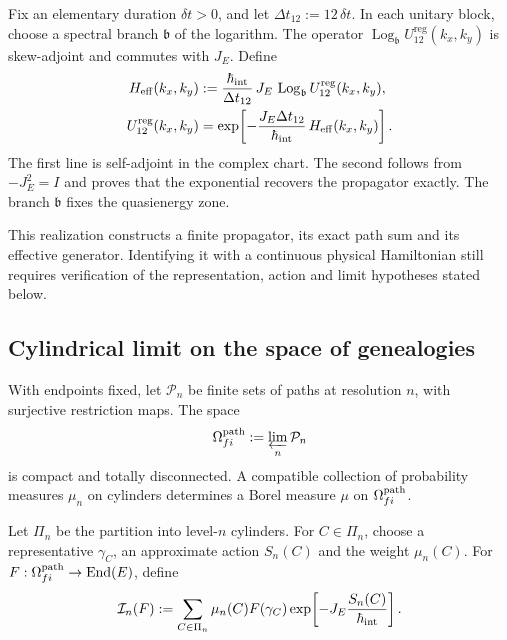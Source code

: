 Fix an elementary duration \(\delta t>0\), and let
\(\Delta t_{12}:=12\,\delta t\). In each unitary block, choose a spectral
branch \(\mathfrak b\) of the logarithm. The operator
\(\operatorname{Log}_{\mathfrak b}U_{12}^{\mathrm{reg}}(k_x,k_y)\) is
skew-adjoint and commutes with \(J_E\). Define
\begin{equation}
 \begin{aligned}
 H_{\rm eff}(k_x,k_y)
 &:=
 \frac{\hbar_{\rm int}}{\Delta t_{12}}\,
 J_E\,
 \operatorname{Log}_{\mathfrak b}
 U_{12}^{\mathrm{reg}}(k_x,k_y),\\
 U_{12}^{\mathrm{reg}}(k_x,k_y)
 &=
 \exp\!\left[
  -\frac{J_E\Delta t_{12}}{\hbar_{\rm int}}\,
  H_{\rm eff}(k_x,k_y)
 \right].
 \end{aligned}
 \label{eq:hamiltoniano-efectivo-registro-27-rev3}
\end{equation}
The first line is self-adjoint in the complex chart. The second follows from
\(-J_E^2=I\) and proves that the exponential recovers the
propagator exactly. The branch \(\mathfrak b\) fixes the quasienergy zone.

This realization constructs a finite propagator, its exact path sum and
its effective generator. Identifying it with a continuous physical Hamiltonian
still requires verification of the representation, action and limit hypotheses
stated below.

\subsection{Cylindrical limit on the space of genealogies}

With endpoints fixed, let \(\mathcal P_n\) be finite sets of paths at
resolution \(n\), with surjective restriction maps. The space
\[
 \Omega^{\rm path}_{fi}:=\varprojlim_n\mathcal P_n
\]
is compact and totally disconnected. A compatible collection of probability
measures \(\mu_n\) on cylinders determines a Borel measure
\(\mu\) on \(\Omega^{\rm path}_{fi}\).

Let \(\Pi_n\) be the partition into level-\(n\) cylinders. For
\(C\in\Pi_n\), choose a representative \(\gamma_C\), an approximate action
\(S_n(C)\) and the weight \(\mu_n(C)\). For
\(F:\Omega^{\rm path}_{fi}\to\operatorname{End}(E)\), define
\begin{equation}
 \mathcal I_n(F)
 :=\sum_{C\in\Pi_n}\mu_n(C)F(\gamma_C)
 \exp\!\left[-J_E\frac{S_n(C)}{\hbar_{\rm int}}\right].
 \label{eq:integral-cilindrica-aproximante-rev2}
\end{equation}

